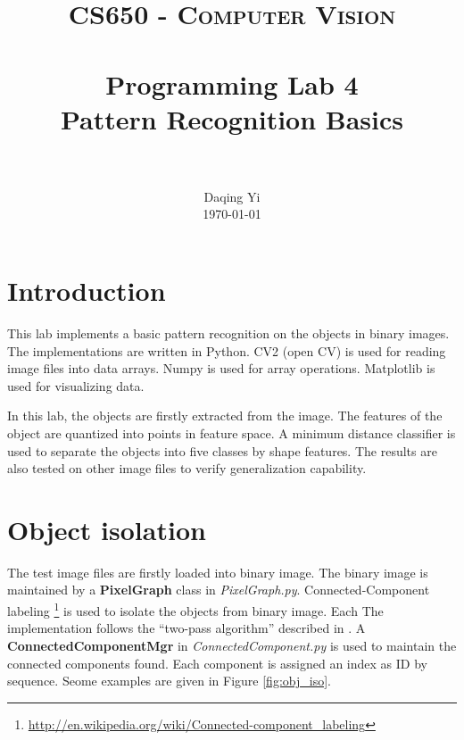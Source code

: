 \documentclass[paper=a4, fontsize=11pt]{scrartcl}
\title{
		\usefont{OT1}{bch}{b}{n}
		\normalfont \normalsize \textsc{CS650 - Computer Vision} \\ [25pt]
		\horrule{0.5pt} \\[0.4cm]
		\huge Programming Lab 4 \\ Pattern Recognition Basics \\
		\horrule{2pt} \\[0.5cm]
}
\author{
		\normalfont 								\normalsize
        Daqing Yi\\[-3pt]		\normalsize
        \today
}
\date{}
\begin{document}
\maketitle

\section{Introduction}
\label{sec:intro}

This lab implements a basic pattern recognition on the objects in binary images.
The implementations are written in Python.
CV2 (open CV) is used for reading image files into data arrays.
Numpy is used for array operations.
Matplotlib is used for visualizing data.

In this lab, the objects are firstly extracted from the image.
The features of the object are quantized into points in feature space.
A minimum distance classifier is used to separate the objects into five classes by shape features.
The results are also tested on other image files to verify generalization capability.

\section{Object isolation}
\label{sec:object_isolation}

The test image files are firstly loaded into binary image.
The binary image is maintained by a \textbf{PixelGraph} class in \emph{PixelGraph.py}.
Connected-Component labeling \footnote{\url{http://en.wikipedia.org/wiki/Connected-component_labeling}}
is used to isolate the objects from binary image.
Each 
The implementation follows the ``two-pass algorithm'' described in \cite{wiki:connected_component_labeling}.
A \textbf{ConnectedComponentMgr} in \emph{ConnectedComponent.py} is used to maintain the connected components found.
Each component is assigned an index as ID by sequence.
Seome examples are given in Figure \ref{fig:obj_iso}.
\end{document}
